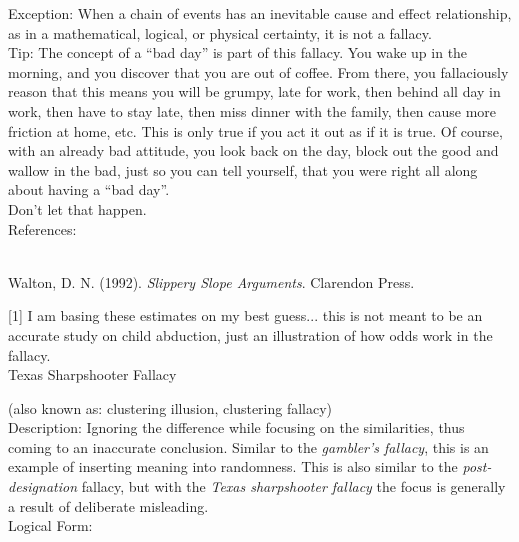 \documentclass[a4paper,12pt,single,pdftex]{scrartcl}
\begin{document}
    
      Exception: When a chain of events has an inevitable cause and effect relationship, as in a mathematical, logical, or physical certainty, it is not a fallacy.
    \\

    
      Tip: The concept of a “bad day” is part of this fallacy.  You wake up in the morning, and you discover that you are out of coffee.  From there, you fallaciously reason that this means you will be grumpy, late for work, then behind all day in work, then have to stay late, then miss dinner with the family, then cause more friction at home, etc.  This is only true if you act it out as if it is true.  Of course, with an already bad attitude, you look back on the day, block out the good and wallow in the bad, just so you can tell yourself, that you were right all along about having a “bad day”.
    \\

    
      Don’t let that happen.
    \\

    References:

    
      
        
      \\

      
        
          Walton, D. N. (1992). {\it Slippery Slope Arguments}. Clarendon Press.
        
      
      
        [1] I am basing these estimates on my best guess... this is not meant to be an accurate study on child abduction, just an illustration of how odds work in the fallacy.
      \\

    
  

Texas Sharpshooter Fallacy
    
      (also known as: clustering illusion, clustering fallacy)
    \\

  
    
      Description: Ignoring the difference while focusing on the similarities, thus coming to an inaccurate conclusion.  Similar to the {\it gambler’s fallacy}, this is an example of inserting meaning into randomness.  This is also similar to the {\it post-designation} fallacy, but with the {\em Texas sharpshooter fallacy} the focus is generally a result of deliberate misleading.
    \\

    
      Logical Form:
    \\
\end{document}
